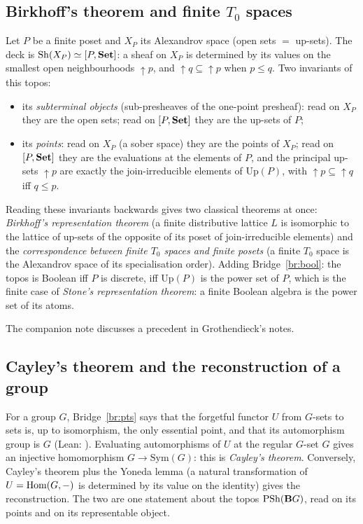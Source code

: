 \subsection{Birkhoff's theorem and finite $T_0$ spaces}

Let $P$ be a finite poset and $X_P$ its Alexandrov space (open sets $=$ up-sets). The deck is $\mathrm{Sh}(X_P)\simeq[P,\mathbf{Set}]$: a sheaf on $X_P$ is determined by its values on the smallest open neighbourhoods $\uparrow p$, and $\uparrow q\subseteq\uparrow p$ when $p\le q$. Two invariants of this topos:
\begin{itemize}
\item its \emph{subterminal objects} (sub-presheaves of the one-point presheaf): read on $X_P$ they are the open sets; read on $[P,\mathbf{Set}]$ they are the up-sets of $P$;
\item its \emph{points}: read on $X_P$ (a sober space) they are the points of $X_P$; read on $[P,\mathbf{Set}]$ they are the evaluations at the elements of $P$, and the principal up-sets $\uparrow p$ are exactly the join-irreducible elements of $\mathrm{Up}(P)$, with $\uparrow p\subseteq\uparrow q$ iff $q\le p$.
\end{itemize}
Reading these invariants backwards gives two classical theorems at once: \emph{Birkhoff's representation theorem} (a finite distributive lattice $L$ is isomorphic to the lattice of up-sets of the opposite of its poset of join-irreducible elements) and the \emph{correspondence between finite $T_0$ spaces and finite posets} (a finite $T_0$ space is the Alexandrov space of its specialisation order). Adding Bridge~\ref{br:bool}: the topos is Boolean iff $P$ is discrete, iff $\mathrm{Up}(P)$ is the power set of $P$, which is the finite case of \emph{Stone's representation theorem}: a finite Boolean algebra is the power set of its atoms.

The companion note \cite{bridges-notes} discusses a precedent in Grothendieck's notes.

\subsection{Cayley's theorem and the reconstruction of a group}

For a group $G$, Bridge~\ref{br:pts} says that the forgetful functor $U$ from $G$-sets to sets is, up to isomorphism, the only essential point, and that its automorphism group is $G$ (Lean: ). Evaluating automorphisms of $U$ at the regular $G$-set $G$ gives an injective homomorphism $G\to\mathrm{Sym}(G)$: this is \emph{Cayley's theorem}. Conversely, Cayley's theorem plus the Yoneda lemma (a natural transformation of $U = \operatorname{Hom}(G,-)$ is determined by its value on the identity) gives the reconstruction. The two are one statement about the topos $\mathrm{PSh}(\mathbf{B} G)$, read on its points and on its representable object.

